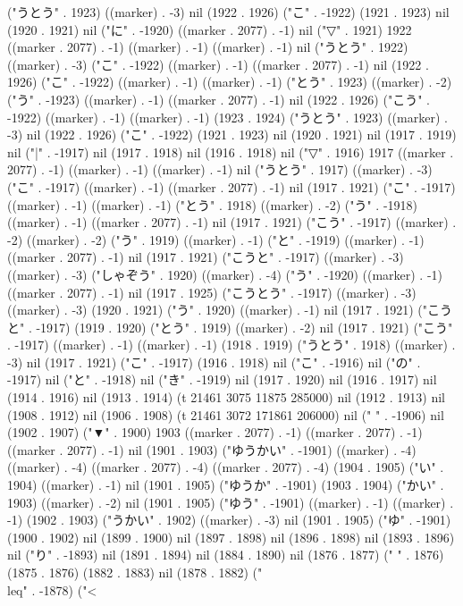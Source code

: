 ("うとう" . 1923) ((marker) . -3) nil (1922 . 1926) ("こ" . -1922) (1921 . 1923) nil (1920 . 1921) nil ("に" . -1920) ((marker . 2077) . -1) nil ("▽" . 1921) 1922 ((marker . 2077) . -1) ((marker) . -1) ((marker) . -1) nil ("うとう" . 1922) ((marker) . -3) ("こ" . -1922) ((marker) . -1) ((marker . 2077) . -1) nil (1922 . 1926) ("こ" . -1922) ((marker) . -1) ((marker) . -1) ("とう" . 1923) ((marker) . -2) ("う" . -1923) ((marker) . -1) ((marker . 2077) . -1) nil (1922 . 1926) ("こう" . -1922) ((marker) . -1) ((marker) . -1) (1923 . 1924) ("うとう" . 1923) ((marker) . -3) nil (1922 . 1926) ("こ" . -1922) (1921 . 1923) nil (1920 . 1921) nil (1917 . 1919) nil ("|" . -1917) nil (1917 . 1918) nil (1916 . 1918) nil ("▽" . 1916) 1917 ((marker . 2077) . -1) ((marker) . -1) ((marker) . -1) nil ("うとう" . 1917) ((marker) . -3) ("こ" . -1917) ((marker) . -1) ((marker . 2077) . -1) nil (1917 . 1921) ("こ" . -1917) ((marker) . -1) ((marker) . -1) ("とう" . 1918) ((marker) . -2) ("う" . -1918) ((marker) . -1) ((marker . 2077) . -1) nil (1917 . 1921) ("こう" . -1917) ((marker) . -2) ((marker) . -2) ("う" . 1919) ((marker) . -1) ("と" . -1919) ((marker) . -1) ((marker . 2077) . -1) nil (1917 . 1921) ("こうと" . -1917) ((marker) . -3) ((marker) . -3) ("しゃぞう" . 1920) ((marker) . -4) ("う" . -1920) ((marker) . -1) ((marker . 2077) . -1) nil (1917 . 1925) ("こうとう" . -1917) ((marker) . -3) ((marker) . -3) (1920 . 1921) ("う" . 1920) ((marker) . -1) nil (1917 . 1921) ("こうと" . -1917) (1919 . 1920) ("とう" . 1919) ((marker) . -2) nil (1917 . 1921) ("こう" . -1917) ((marker) . -1) ((marker) . -1) (1918 . 1919) ("うとう" . 1918) ((marker) . -3) nil (1917 . 1921) ("こ" . -1917) (1916 . 1918) nil ("こ" . -1916) nil ("の" . -1917) nil ("と" . -1918) nil ("き" . -1919) nil (1917 . 1920) nil (1916 . 1917) nil (1914 . 1916) nil (1913 . 1914) (t 21461 3075 11875 285000) nil (1912 . 1913) nil (1908 . 1912) nil (1906 . 1908) (t 21461 3072 171861 206000) nil (" " . -1906) nil (1902 . 1907) ("▼" . 1900) 1903 ((marker . 2077) . -1) ((marker . 2077) . -1) ((marker . 2077) . -1) nil (1901 . 1903) ("ゆうかい" . -1901) ((marker) . -4) ((marker) . -4) ((marker . 2077) . -4) ((marker . 2077) . -4) (1904 . 1905) ("い" . 1904) ((marker) . -1) nil (1901 . 1905) ("ゆうか" . -1901) (1903 . 1904) ("かい" . 1903) ((marker) . -2) nil (1901 . 1905) ("ゆう" . -1901) ((marker) . -1) ((marker) . -1) (1902 . 1903) ("うかい" . 1902) ((marker) . -3) nil (1901 . 1905) ("ゆ" . -1901) (1900 . 1902) nil (1899 . 1900) nil (1897 . 1898) nil (1896 . 1898) nil (1893 . 1896) nil ("り" . -1893) nil (1891 . 1894) nil (1884 . 1890) nil (1876 . 1877) (" " . 1876) (1875 . 1876) (1882 . 1883) nil (1878 . 1882) ("\\leq" . -1878) ("<
